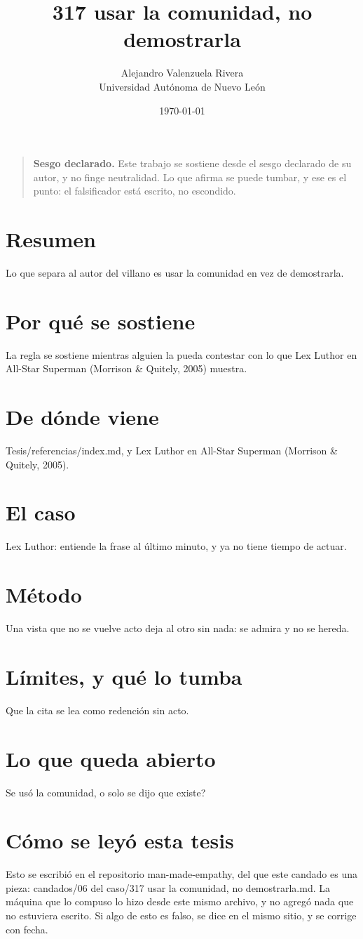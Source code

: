 \documentclass[11pt,a4paper]{article}
\title{317 usar la comunidad, no demostrarla}
\author{Alejandro Valenzuela Rivera\\\small Universidad Autónoma de Nuevo León}
\date{\today}
\begin{document}
\maketitle

\begin{quote}
\textbf{Sesgo declarado.} Este trabajo se sostiene desde el sesgo declarado de su autor, y no finge neutralidad. Lo que afirma se puede tumbar, y ese es el punto: el falsificador está escrito, no escondido.
\end{quote}

\section*{Resumen}
Lo que separa al autor del villano es usar la comunidad en vez de demostrarla.

\section{Por qué se sostiene}
La regla se sostiene mientras alguien la pueda contestar con lo que Lex Luthor en All-Star Superman (Morrison \& Quitely, 2005) muestra.

\section{De dónde viene}
Tesis/referencias/index.md, y Lex Luthor en All-Star Superman (Morrison \& Quitely, 2005).

\section{El caso}
Lex Luthor: entiende la frase al último minuto, y ya no tiene tiempo de actuar.

\section{Método}
Una vista que no se vuelve acto deja al otro sin nada: se admira y no se hereda.

\section{Límites, y qué lo tumba}
Que la cita se lea como redención sin acto.

\section{Lo que queda abierto}
\textquestiondown{}Se usó la comunidad, o solo se dijo que existe?

\section*{Cómo se leyó esta tesis}
Esto se escribió en el repositorio man-made-empathy, del que este candado es una pieza: candados/06 del caso/317 usar la comunidad, no demostrarla.md. La máquina que lo compuso lo hizo desde este mismo archivo, y no agregó nada que no estuviera escrito. Si algo de esto es falso, se dice en el mismo sitio, y se corrige con fecha.
\end{document}
